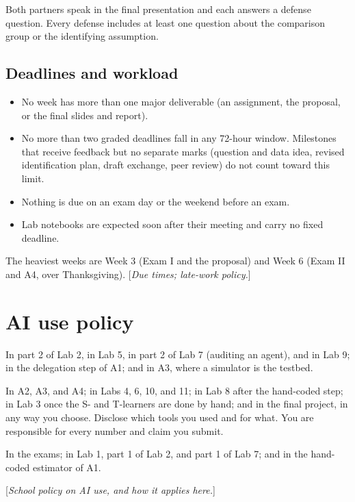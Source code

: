 \documentclass[11pt]{article}
\newcommand{\tbd}[1]{\textcolor{warnred}{[\emph{#1}]}}
\begin{document}
Both partners speak in the final presentation and each answers a defense question. Every defense
includes at least one question about the comparison group or the identifying assumption.

\subsection*{Deadlines and workload}

\begin{itemize}
    \item No week has more than one major deliverable (an assignment, the proposal, or the final slides
    and report).
    \item No more than two graded deadlines fall in any 72-hour window. Milestones that receive
    feedback but no separate marks (question and data idea, revised identification plan, draft
    exchange, peer review) do not count toward this limit.
    \item Nothing is due on an exam day or the weekend before an exam.
    \item Lab notebooks are expected soon after their meeting and carry no fixed deadline.
\end{itemize}
The heaviest weeks are Week 3 (Exam I and the proposal) and Week 6 (Exam II and A4, over
Thanksgiving). \tbd{Due times; late-work policy.}

\section*{AI use policy}

\begin{description}[leftmargin=1.5em, style=nextline]
\item[Required] In part 2 of Lab 2, in Lab 5, in part 2 of Lab 7 (auditing an agent), and in Lab 9;
in the delegation step of A1; and in A3, where a simulator is the testbed.
\item[Allowed, with disclosure] In A2, A3, and A4; in Labs 4, 6, 10, and 11; in Lab 8 after the
hand-coded step; in Lab 3 once the S- and T-learners are done by hand; and in the final project, in
any way you choose. Disclose which tools you used and for what. You are responsible for every number
and claim you submit.
\item[Prohibited] In the exams; in
Lab 1, part 1 of Lab 2, and part 1 of Lab 7; and in the hand-coded estimator of A1.
\end{description}
\tbd{School policy on AI use, and how it applies here.}
\end{document}
